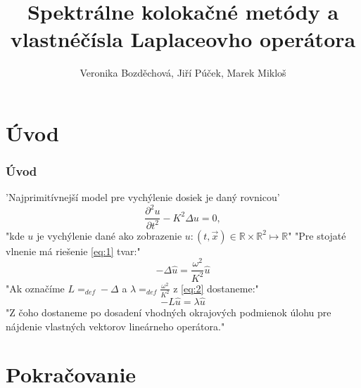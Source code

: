 \documentclass{beamer}
\title[Spektrálne metódy]{Spektrálne kolokačné metódy a vlastnéčísla Laplaceovho operátora}
\author[Veronika Bozděchová, Jiří Púček, Marek Mikloš] {Veronika Bozděchová, Jiří Púček, Marek Mikloš \\ }
\institute[Charles University]{Charles University, Czech Republic}
\date{}
\begin{document}
\begin{frame}
\titlepage

\end{frame}


\section*{Úvod}
\label{sec:1}


\begin{frame}
 \frametitle{Úvod}

'Najprimitívnejší model pre vychýlenie dosiek je daný rovnicou'
\begin{equation}
\label{eq:1}
\frac{\partial ^2{u}}{\partial {t^{2}}}-K^{2}\Delta{u}=0,
\end{equation}
"kde $u$ je vychýlenie dané ako zobrazenie $u:(t,\vec{x}) \in \mathbb{R} \times \mathbb{R}^{2} \mapsto \mathbb{R}$"
"Pre stojaté vlnenie má riešenie \ref{eq:1} tvar:"
\begin{equation}
\label{eq:2}
-\Delta{\widehat{u}}=\frac{\omega^{2}}{K^{2}}\widehat{u}
\end{equation}
"Ak označíme $L=_{def}-\Delta$ a $\lambda=_{def}\frac{\omega^{2}}{K^{2}}$ z \ref{eq:2} dostaneme:"
\begin{equation}
\label{eq:3}
-L{\widehat{u}}=\lambda\widehat{u}
\end{equation}
"Z čoho dostaneme po dosadení vhodných okrajových podmienok úlohu pre nájdenie vlastných vektorov lineárneho operátora."

\end{frame}

\section*{Pokračovanie}
\label{sec:P}
\end{document}
